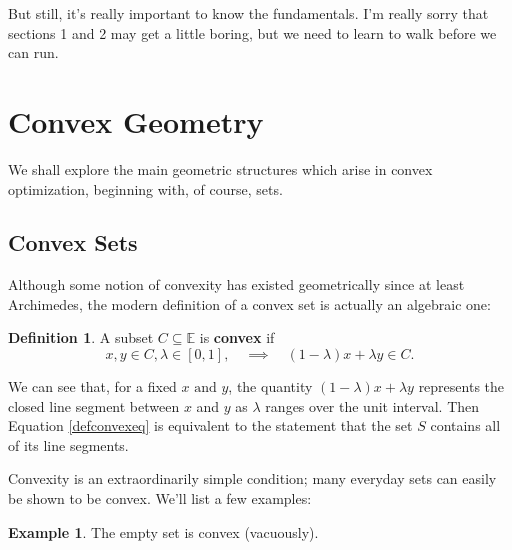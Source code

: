 \documentclass[11pt]{article}
\numberwithin{equation}{section}
\theoremstyle{definition}
\newtheorem{example}[theorem]{Example}
\newtheorem{definition}[theorem]{Definition}%
\newcommand{\bE}{\mathbb{E}}
\newcommand{\AND}{\text{ and }}
\begin{document}
But still, it's really important to know the fundamentals. I'm really sorry that sections 1 and 2 may get a little boring, but we need to learn to walk before we can run.
\newpage
\section{Convex Geometry}
We shall explore the main geometric structures which arise in convex optimization, beginning with, of course, sets.
\subsection{Convex Sets}
Although some notion of convexity has existed geometrically since at least Archimedes, the modern definition of a convex set is actually an algebraic one:
\begin{definition}
    \label{defconvex}%
    A subset $C\subseteq\bE$ is \textbf{convex} if
    \begin{equation} \label{defconvexeq}%
    x, y\in C, \lambda\in[0,1],\quad\implies\quad (1-\lambda)x+\lambda y\in C.\end{equation}
\end{definition}
We can see that, for a fixed $x\AND y$, the quantity $(1-\lambda)x+\lambda y$ represents the closed line segment between $x$ and $y$ as $\lambda$ ranges over the unit interval. Then Equation \ref{defconvexeq} is equivalent to the statement that the set $S$ contains all of its line segments.

Convexity is an extraordinarily simple condition; many everyday sets can easily be shown to be convex. We'll list a few examples:
\begin{example}
    The empty set is convex (vacuously).
\end{example}
    
\end{document}
